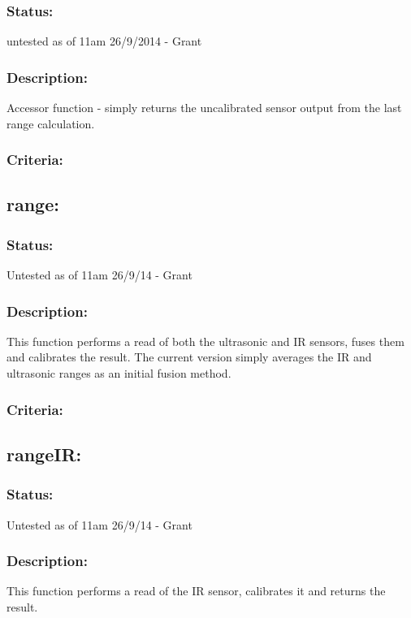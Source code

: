\documentclass[]{article}
\begin{document}
\subsubsection{Status:}
untested as of 11am 26/9/2014 - Grant

\subsubsection{Description:}
Accessor function - simply returns the uncalibrated sensor output from the last range calculation.

\subsubsection{Criteria:}

\subsection{range:}
\subsubsection{Status:}
Untested as of 11am 26/9/14 - Grant

\subsubsection{Description:}
This function performs a read of both the ultrasonic and IR sensors, fuses them and calibrates the result. The current version simply averages the IR and ultrasonic ranges as an initial fusion method.

\subsubsection{Criteria:}

\subsection{rangeIR:}
\subsubsection{Status:}
Untested as of 11am 26/9/14 - Grant

\subsubsection{Description:}
This function performs a read of the IR sensor, calibrates it and returns the result.
\end{document}
